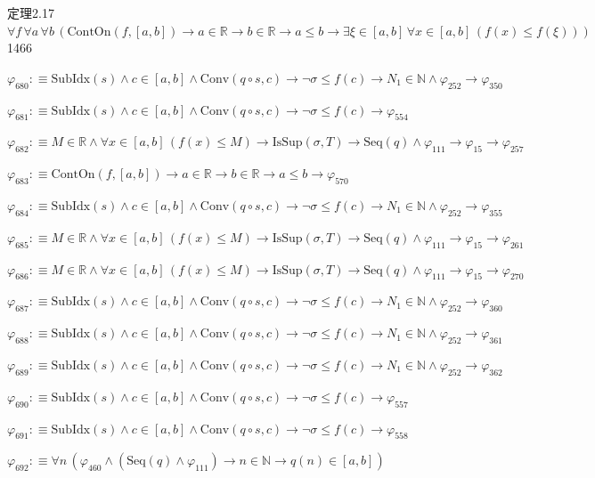 \begin{fullproof}{定理2.17}{$\forall f\,\forall a\,\forall b\,(\mathrm{ContOn}(f,[a,b]) \to a \in \mathbb{R} \to b \in \mathbb{R} \to a \leq b \to \exists \xi \in [a,b]\,\forall x \in [a,b]\,(f(x) \leq f(\xi)))$}{1466}
\begin{abbrevlist}
\item $\varphi_{680} :\equiv \mathrm{SubIdx}(s) \land c \in [a,b] \land \mathrm{Conv}(q \circ s,c) \to \neg \sigma \leq f(c) \to N_{1} \in \mathbb{N} \land \varphi_{252} \to \varphi_{350}$
\item $\varphi_{681} :\equiv \mathrm{SubIdx}(s) \land c \in [a,b] \land \mathrm{Conv}(q \circ s,c) \to \neg \sigma \leq f(c) \to \varphi_{554}$
\item $\varphi_{682} :\equiv M \in \mathbb{R} \land \forall x \in [a,b]\,(f(x) \leq M) \to \mathrm{IsSup}(\sigma,T) \to \mathrm{Seq}(q) \land \varphi_{111} \to \varphi_{15} \to \varphi_{257}$
\item $\varphi_{683} :\equiv \mathrm{ContOn}(f,[a,b]) \to a \in \mathbb{R} \to b \in \mathbb{R} \to a \leq b \to \varphi_{570}$
\item $\varphi_{684} :\equiv \mathrm{SubIdx}(s) \land c \in [a,b] \land \mathrm{Conv}(q \circ s,c) \to \neg \sigma \leq f(c) \to N_{1} \in \mathbb{N} \land \varphi_{252} \to \varphi_{355}$
\item $\varphi_{685} :\equiv M \in \mathbb{R} \land \forall x \in [a,b]\,(f(x) \leq M) \to \mathrm{IsSup}(\sigma,T) \to \mathrm{Seq}(q) \land \varphi_{111} \to \varphi_{15} \to \varphi_{261}$
\item $\varphi_{686} :\equiv M \in \mathbb{R} \land \forall x \in [a,b]\,(f(x) \leq M) \to \mathrm{IsSup}(\sigma,T) \to \mathrm{Seq}(q) \land \varphi_{111} \to \varphi_{15} \to \varphi_{270}$
\item $\varphi_{687} :\equiv \mathrm{SubIdx}(s) \land c \in [a,b] \land \mathrm{Conv}(q \circ s,c) \to \neg \sigma \leq f(c) \to N_{1} \in \mathbb{N} \land \varphi_{252} \to \varphi_{360}$
\item $\varphi_{688} :\equiv \mathrm{SubIdx}(s) \land c \in [a,b] \land \mathrm{Conv}(q \circ s,c) \to \neg \sigma \leq f(c) \to N_{1} \in \mathbb{N} \land \varphi_{252} \to \varphi_{361}$
\item $\varphi_{689} :\equiv \mathrm{SubIdx}(s) \land c \in [a,b] \land \mathrm{Conv}(q \circ s,c) \to \neg \sigma \leq f(c) \to N_{1} \in \mathbb{N} \land \varphi_{252} \to \varphi_{362}$
\item $\varphi_{690} :\equiv \mathrm{SubIdx}(s) \land c \in [a,b] \land \mathrm{Conv}(q \circ s,c) \to \neg \sigma \leq f(c) \to \varphi_{557}$
\item $\varphi_{691} :\equiv \mathrm{SubIdx}(s) \land c \in [a,b] \land \mathrm{Conv}(q \circ s,c) \to \neg \sigma \leq f(c) \to \varphi_{558}$
\item $\varphi_{692} :\equiv \forall n\,(\varphi_{460} \land (\mathrm{Seq}(q) \land \varphi_{111}) \to n \in \mathbb{N} \to q(n) \in [a,b])$

\end{abbrevlist}
\end{fullproof}
